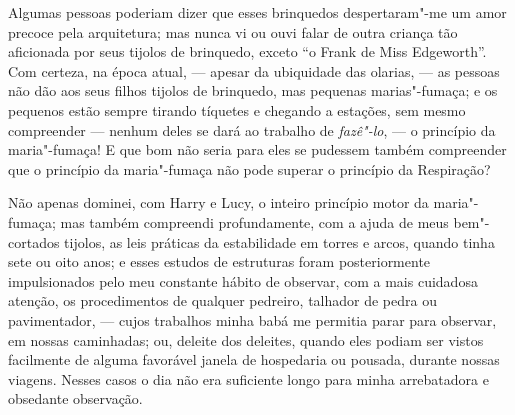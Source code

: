 {{{{{{{{{{{{{{{{{%
Algumas pessoas poderiam dizer que esses brinquedos despertaram"-me
um amor precoce pela arquitetura; mas nunca vi ou ouvi falar de outra
criança tão aficionada por seus tijolos de brinquedo, exceto ``o Frank
de Miss Edgeworth''. Com certeza, na época atual, --- apesar da
ubiquidade das olarias, --- as pessoas não dão aos seus filhos tijolos de
brinquedo, mas pequenas marias"-fumaça; e os pequenos estão sempre
tirando tíquetes e chegando a estações, sem mesmo compreender --- nenhum
deles se dará ao trabalho de \textit{fazê"-lo}, --- o princípio da
maria"-fumaça! E que bom não seria para eles se pudessem também
compreender que o princípio da maria"-fumaça não pode superar o princípio
da Respiração?

Não apenas dominei, com Harry e Lucy, o inteiro princípio motor da
maria"-fumaça; mas também compreendi profundamente, com a ajuda de meus
bem"-cortados tijolos, as leis práticas da estabilidade em torres e
arcos, quando tinha sete ou oito anos; e esses estudos de estruturas
foram posteriormente impulsionados pelo meu constante hábito de
observar, com a mais cuidadosa atenção, os procedimentos de qualquer
pedreiro, talhador de pedra ou pavimentador, --- cujos trabalhos minha
babá me permitia parar para observar, em nossas caminhadas; ou, deleite
dos deleites, quando eles podiam ser vistos facilmente de alguma
favorável janela de hospedaria ou pousada, durante nossas viagens.
Nesses casos o dia não era suficiente longo para minha arrebatadora e
obsedante observação.

}}}}}}}}}}}}}}}}}
